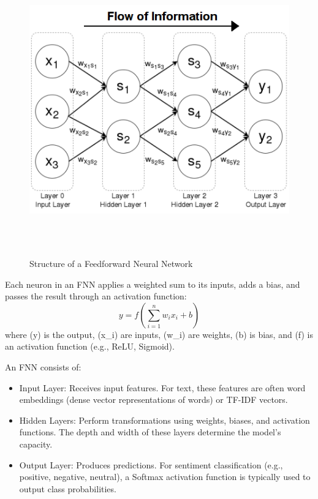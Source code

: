 \begin{figure}[h!]
    \centering
    \includegraphics[width=0.8\linewidth]{images/fnn-str.png}
    \caption{Structure of a Feedforward Neural Network}
    \label{fig:feedforward_structure}
\end{figure}

Each neuron in an FNN applies a weighted sum to its inputs, adds a bias, and passes the result through an activation function:
$$
y = f\left(\sum_{i=1}^{n} w_i x_i + b\right)
$$
where (y) is the output, (x\_i) are inputs, (w\_i) are weights, (b) is bias, and (f) is an activation function (e.g., ReLU, Sigmoid).

An FNN consists of:

\begin{itemize}
    \item Input Layer: Receives input features. For text, these features are often word embeddings (dense vector representations of words) or TF-IDF vectors.
    \item Hidden Layers: Perform transformations using weights, biases, and activation functions. The depth and width of these layers determine the model's capacity.
    \item Output Layer: Produces predictions. For sentiment classification (e.g., positive, negative, neutral), a Softmax activation function is typically used to output class probabilities.
\end{itemize}


